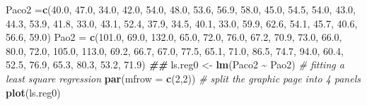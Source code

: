 \documentclass[
]{book}
\newenvironment{Shaded}{\begin{snugshade}}{\end{snugshade}}
\newcommand{\AttributeTok}[1]{\textcolor[rgb]{0.13,0.29,0.53}{#1}}
\newcommand{\CommentTok}[1]{\textcolor[rgb]{0.56,0.35,0.01}{\textit{#1}}}
\newcommand{\DecValTok}[1]{\textcolor[rgb]{0.00,0.00,0.81}{#1}}
\newcommand{\DocumentationTok}[1]{\textcolor[rgb]{0.56,0.35,0.01}{\textbf{\textit{#1}}}}
\newcommand{\FloatTok}[1]{\textcolor[rgb]{0.00,0.00,0.81}{#1}}
\newcommand{\FunctionTok}[1]{\textcolor[rgb]{0.13,0.29,0.53}{\textbf{#1}}}
\newcommand{\NormalTok}[1]{#1}
\newcommand{\OtherTok}[1]{\textcolor[rgb]{0.56,0.35,0.01}{#1}}
\newcommand{\SpecialCharTok}[1]{\textcolor[rgb]{0.81,0.36,0.00}{\textbf{#1}}}
\begin{document}
\begin{Shaded}
\begin{Highlighting}[]
\NormalTok{Paco2 }\OtherTok{=}\FunctionTok{c}\NormalTok{(}\FloatTok{40.0}\NormalTok{, }\FloatTok{47.0}\NormalTok{, }\FloatTok{34.0}\NormalTok{, }\FloatTok{42.0}\NormalTok{, }\FloatTok{54.0}\NormalTok{, }\FloatTok{48.0}\NormalTok{, }\FloatTok{53.6}\NormalTok{, }\FloatTok{56.9}\NormalTok{, }\FloatTok{58.0}\NormalTok{, }\FloatTok{45.0}\NormalTok{, }\FloatTok{54.5}\NormalTok{, }\FloatTok{54.0}\NormalTok{, }
         \FloatTok{43.0}\NormalTok{, }\FloatTok{44.3}\NormalTok{, }\FloatTok{53.9}\NormalTok{, }\FloatTok{41.8}\NormalTok{, }\FloatTok{33.0}\NormalTok{, }\FloatTok{43.1}\NormalTok{, }\FloatTok{52.4}\NormalTok{, }\FloatTok{37.9}\NormalTok{, }\FloatTok{34.5}\NormalTok{, }\FloatTok{40.1}\NormalTok{, }\FloatTok{33.0}\NormalTok{, }\FloatTok{59.9}\NormalTok{, }
         \FloatTok{62.6}\NormalTok{, }\FloatTok{54.1}\NormalTok{, }\FloatTok{45.7}\NormalTok{, }\FloatTok{40.6}\NormalTok{, }\FloatTok{56.6}\NormalTok{, }\FloatTok{59.0}\NormalTok{)}
\NormalTok{Pao2 }\OtherTok{=} \FunctionTok{c}\NormalTok{(}\FloatTok{101.0}\NormalTok{, }\FloatTok{69.0}\NormalTok{, }\FloatTok{132.0}\NormalTok{, }\FloatTok{65.0}\NormalTok{, }\FloatTok{72.0}\NormalTok{, }\FloatTok{76.0}\NormalTok{, }\FloatTok{67.2}\NormalTok{, }\FloatTok{70.9}\NormalTok{, }\FloatTok{73.0}\NormalTok{, }\FloatTok{66.0}\NormalTok{, }\FloatTok{80.0}\NormalTok{, }\FloatTok{72.0}\NormalTok{,}
         \FloatTok{105.0}\NormalTok{, }\FloatTok{113.0}\NormalTok{, }\FloatTok{69.2}\NormalTok{, }\FloatTok{66.7}\NormalTok{, }\FloatTok{67.0}\NormalTok{, }\FloatTok{77.5}\NormalTok{, }\FloatTok{65.1}\NormalTok{, }\FloatTok{71.0}\NormalTok{, }\FloatTok{86.5}\NormalTok{, }\FloatTok{74.7}\NormalTok{, }\FloatTok{94.0}\NormalTok{, }\FloatTok{60.4}\NormalTok{,}
         \FloatTok{52.5}\NormalTok{, }\FloatTok{76.9}\NormalTok{, }\FloatTok{65.3}\NormalTok{, }\FloatTok{80.3}\NormalTok{, }\FloatTok{53.2}\NormalTok{, }\FloatTok{71.9}\NormalTok{)}
\DocumentationTok{\#\#}
\NormalTok{ls.reg0 }\OtherTok{\textless{}{-}} \FunctionTok{lm}\NormalTok{(Paco2 }\SpecialCharTok{\textasciitilde{}}\NormalTok{ Pao2)   }\CommentTok{\# fitting a least square regression}
\FunctionTok{par}\NormalTok{(}\AttributeTok{mfrow =} \FunctionTok{c}\NormalTok{(}\DecValTok{2}\NormalTok{,}\DecValTok{2}\NormalTok{))   }\CommentTok{\# split the graphic page into 4 panels}
\FunctionTok{plot}\NormalTok{(ls.reg0)}
\end{Highlighting}
\end{Shaded}
\end{document}
